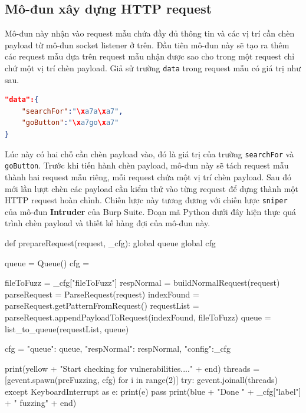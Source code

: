 \subsection{Mô-đun xây dựng HTTP request}
Mô-đun này nhận vào request mẫu chứa đầy đủ thông tin và các vị trí cần chèn payload từ mô-đun socket listener ở trên. Đầu tiên mô-đun này sẽ tạo ra thêm các request mẫu dựa trên request mẫu nhận được sao cho trong một request chỉ chứ một vị trí chèn payload. Giả sử trường \texttt{data} trong request mẫu có giá trị như sau.\\
\begin{lstlisting}[language=json,firstnumber=1]
"data":{ 
    "searchFor":"\xa7a\xa7",
    "goButton":"\xa7go\xa7"
}
\end{lstlisting}
Lúc này có hai chỗ cần chèn payload vào, đó là giá trị của trường \texttt{searchFor} và \texttt{goButton}. Trước khi tiến hành chèn payload, mô-đun này sẽ tách request mẫu thành hai request mẫu riêng, mỗi request chứa một vị trí chèn payload. Sau đó mới lần lượt chèn các payload cần kiểm thử vào từng request để dựng thành một HTTP request hoàn chỉnh. Chiến lược này tương đương với chiến lược \texttt{sniper} của mô-đun \textbf{Intruder} của Burp Suite. Đoạn mã Python dưới đây hiện thực quá trình chèn payload và thiết kế hàng đợi của mô-đun này.\\
\begin{python}
def prepareRequest(request, _cfg):
    global queue
    global cfg

    queue = Queue()
    cfg = {}

    fileToFuzz = _cfg["fileToFuzz"]
    respNormal = buildNormalRequest(request)
    parseRequest = ParseRequest(request)
    indexFound = parseRequest.getPatternFromRequest()
    requestList = parseRequest.appendPayloadToRequest(indexFound, fileToFuzz)
    queue = list_to_queue(requestList, queue)

    cfg = {"queue": queue, "respNormal": respNormal, "config":_cfg}

    print(yellow + "Start checking for vulnerabilities...." + end)
    threads = [gevent.spawn(preFuzzing, cfg) for i in range(2)] 
    try:
        gevent.joinall(threads)
    except KeyboardInterrupt as e:
        print(e)
        pass
    print(blue + "Done " + _cfg["label"] + " fuzzing" + end)
\end{python}
